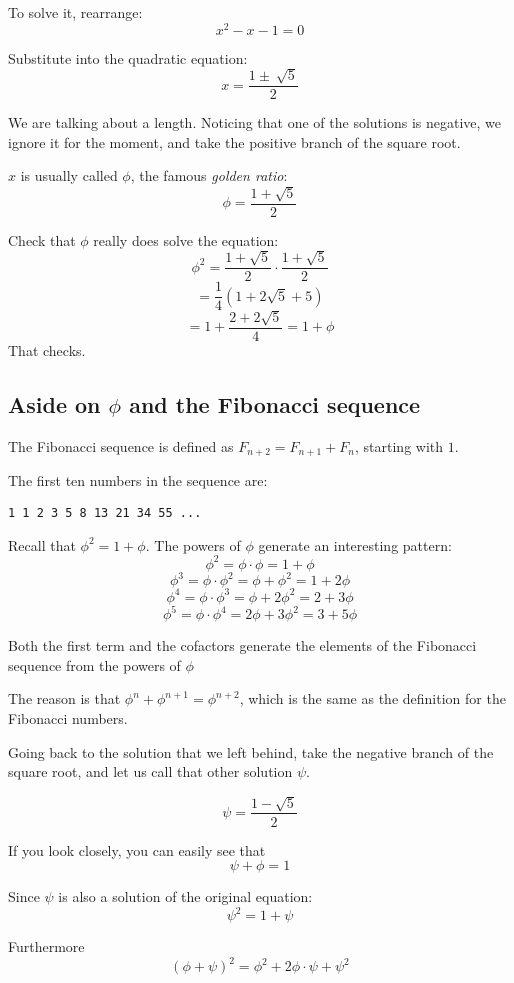 \documentclass[11pt, oneside]{article}
\begin{document}
To solve it, rearrange:
\[ x^2 - x - 1 = 0 \]

Substitute into the quadratic equation:
\[ x = \frac{1 \pm \ \sqrt{5}}{2} \]

We are talking about a length.  Noticing that one of the solutions is negative, we ignore it for the moment, and take the positive branch of the square root.

$x$ is usually called $\phi$, the famous \emph{golden ratio}:
\[ \phi = \frac{1 + \sqrt{5}}{2} \]

Check that $\phi$ really does solve the equation:
\[ \phi^2 =  \frac{1 + \sqrt{5}}{2} \cdot  \frac{1 + \sqrt{5}}{2} \]
\[ = \frac{1}{4} (1 + 2 \sqrt{5} + 5) \]
\[ = 1 + \frac{2 + 2 \sqrt{5}}{4} = 1 + \phi \]
That checks.  

\subsection*{Aside on $\phi$ and the Fibonacci sequence}

The Fibonacci sequence is defined as $F_{n+2} = F_{n+1} + F_n$, starting with $1$.  

The first ten numbers in the sequence are:
\begin{verbatim}
1 1 2 3 5 8 13 21 34 55 ...
\end{verbatim}

Recall that $\phi^2 = 1 + \phi$.  The powers of $\phi$ generate an interesting pattern:
\[ \phi^2 = \phi \cdot \phi = 1 + \phi \]
\[ \phi^3 = \phi \cdot \phi^2 = \phi + \phi^2 = 1 + 2 \phi \]
\[ \phi^4 = \phi \cdot \phi^3 = \phi + 2 \phi^2 = 2 + 3 \phi \]
\[ \phi^5 = \phi \cdot \phi^4 = 2 \phi + 3 \phi^2 = 3 + 5 \phi \]

Both the first term and the cofactors generate the elements of the Fibonacci sequence from the powers of $\phi$

The reason is that $\phi^n + \phi^{n+1} = \phi^{n+2}$, which is the same as the definition for the Fibonacci numbers.

Going back to the solution that we left behind, take the negative branch of the square root, and let us call that other solution $\psi$.  

\[ \psi = \frac{1 - \sqrt{5}}{2} \]

If you look closely, you can easily see that
\[ \psi + \phi = 1 \]

Since $\psi$ is also a solution of the original equation:
\[ \psi^2 = 1 + \psi \]

Furthermore
\[ (\phi + \psi)^2 = \phi^2 + 2 \phi \cdot \psi + \psi^2 \]
\end{document}
